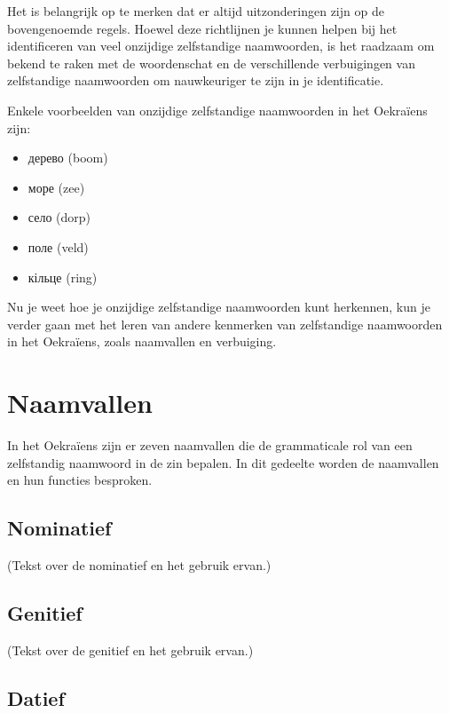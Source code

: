 \documentclass[
  letterpaper,
  DIV=11,
  numbers=noendperiod]{scrreprt}
\providecommand{\tightlist}{%
  \setlength{\itemsep}{0pt}\setlength{\parskip}{0pt}}\usepackage{longtable,booktabs,array}
\begin{document}
Het is belangrijk op te merken dat er altijd uitzonderingen zijn op de
bovengenoemde regels. Hoewel deze richtlijnen je kunnen helpen bij het
identificeren van veel onzijdige zelfstandige naamwoorden, is het
raadzaam om bekend te raken met de woordenschat en de verschillende
verbuigingen van zelfstandige naamwoorden om nauwkeuriger te zijn in je
identificatie.

Enkele voorbeelden van onzijdige zelfstandige naamwoorden in het
Oekraïens zijn:

\begin{itemize}
\tightlist
\item
  дерево (boom)
\item
  море (zee)
\item
  село (dorp)
\item
  поле (veld)
\item
  кільце (ring)
\end{itemize}

Nu je weet hoe je onzijdige zelfstandige naamwoorden kunt herkennen, kun
je verder gaan met het leren van andere kenmerken van zelfstandige
naamwoorden in het Oekraïens, zoals naamvallen en verbuiging.

\hypertarget{naamvallen}{%
\section{Naamvallen}\label{naamvallen}}

In het Oekraïens zijn er zeven naamvallen die de grammaticale rol van
een zelfstandig naamwoord in de zin bepalen. In dit gedeelte worden de
naamvallen en hun functies besproken.

\hypertarget{nominatief}{%
\subsection{Nominatief}\label{nominatief}}

(Tekst over de nominatief en het gebruik ervan.)

\hypertarget{genitief}{%
\subsection{Genitief}\label{genitief}}

(Tekst over de genitief en het gebruik ervan.)

\hypertarget{datief}{%
\subsection{Datief}\label{datief}}
\end{document}
